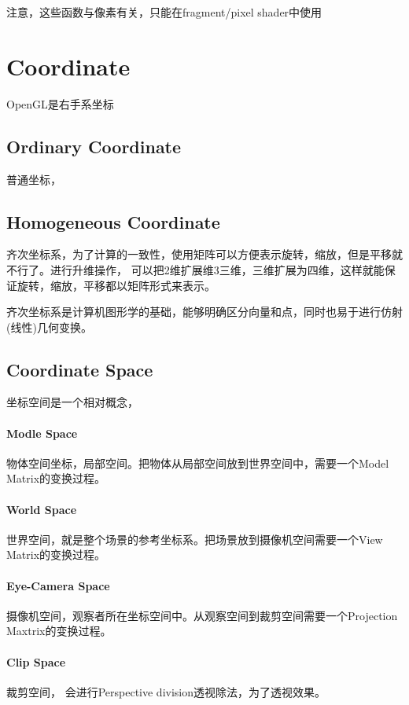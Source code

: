 注意，这些函数与像素有关，只能在fragment/pixel shader中使用

\section{Coordinate}

OpenGL是右手系坐标

\subsection{Ordinary Coordinate}
普通坐标，

\subsection{Homogeneous Coordinate}
齐次坐标系，为了计算的一致性，使用矩阵可以方便表示旋转，缩放，但是平移就不行了。进行升维操作，
可以把2维扩展维3三维，三维扩展为四维，这样就能保证旋转，缩放，平移都以矩阵形式来表示。

齐次坐标系是计算机图形学的基础，能够明确区分向量和点，同时也易于进行仿射(线性)几何变换。

\subsection{Coordinate Space}
坐标空间是一个相对概念，

\paragraph{Modle Space}
物体空间坐标，局部空间。把物体从局部空间放到世界空间中，需要一个Model Matrix的变换过程。

\paragraph{World Space}
世界空间，就是整个场景的参考坐标系。把场景放到摄像机空间需要一个View Matrix的变换过程。

\paragraph{Eye-Camera Space}
摄像机空间，观察者所在坐标空间中。从观察空间到裁剪空间需要一个Projection Maxtrix的变换过程。

\paragraph{Clip Space}
裁剪空间，
会进行Perspective division透视除法，为了透视效果。


